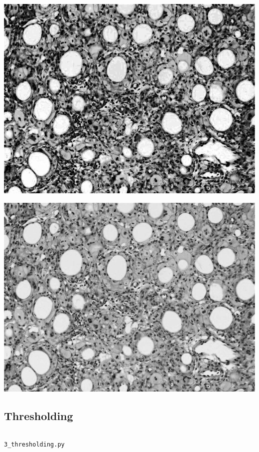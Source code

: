 \documentclass[a4paper]{article}
\newenvironment{code}{\captionsetup{type=listing}}{}
\begin{document}
\begin{minipage}{0.49\textwidth}
    \centering
    \includegraphics[width=\textwidth]{../code/task1/output/histogram_equalised.jpg}
\end{minipage}
\hfill
\begin{minipage}{0.49\textwidth}
    \centering
    \includegraphics[width=\textwidth]{../code/task1/output/contrast_stretched.jpg}
\end{minipage}

\subsection{Thresholding}
\begin{code}
\inputminted[linenos, breaklines, frame=single]{python}{../code/task1/3_thresholding.py}
\caption{\texttt{3_thresholding.py}}
\end{code}
\end{document}
